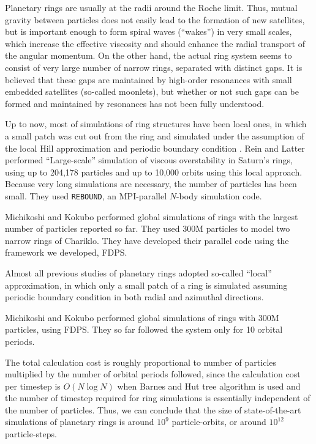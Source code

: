 \documentclass[conference]{IEEEtran}
\begin{document}
Planetary rings are usually at the radii around the Roche limit. Thus,
mutual gravity between particles does not easily lead to the formation
of new satellites, but is important enough to form spiral waves
(``wakes'') in very small scales, which increase the effective
viscosity and should enhance the radial transport of the angular
momentum. On the other hand, the actual ring system seems to consist
of very large number of narrow rings, separated with distinct gaps. It
is believed that these gaps are maintained by high-order resonances
with small embedded satellites (so-called moonlets), but whether or
not such gaps can be formed and maintained by resonances has not been
fully understood.

Up to now, most of simulations of ring structures have been local
ones, in which a small patch  was cut out from the ring and simulated
under the assumption of the local Hill approximation and periodic
boundary condition \cite{WisdomTremaine1988}. Rein and Latter\cite{ReinLatter2013} performed ``Large-scale'' simulation of viscous
overstability in Saturn's rings, using up to 204,178 particles and up
to 10,000 orbits using this local approach.  Because very long
simulations are necessary, the number of particles has been
small. They used {\tt REBOUND}\cite{ReinLiu2012}, an MPI-parallel
$N$-body simulation code.


Michikoshi and Kokubo\cite{MichikoshiKokubo2017} performed global simulations of rings with
the largest number of particles reported so far. They used 300M particles to
model two narrow rings of Chariklo. They have developed their parallel
code using the framework we developed, FDPS\cite{Iwasawaetal2016}. 



Almost all previous studies of
planetary rings adopted so-called ``local'' approximation, in which
only a small patch of a ring is simulated assuming periodic boundary
condition in both radial and azimuthal directions. 

Michikoshi and Kokubo\cite{MichikoshiKokubo2017} performed global
simulations of rings with 300M particles, using
FDPS\cite{Iwasawaetal2016}. They so far followed the system only for
10 orbital periods.

The total calculation cost is roughly proportional to number of
particles multiplied by the number of orbital periods followed, since
the calculation cost per timestep is $O(N \log N)$ when Barnes and Hut
tree algorithm is used and the number of timestep required for ring
simulations is essentially independent of the number of
particles. Thus, we can conclude that the size of state-of-the-art
simulations of planetary rings is around $10^9$ particle-orbits, or
around $10^{12}$ particle-steps.
\end{document}
